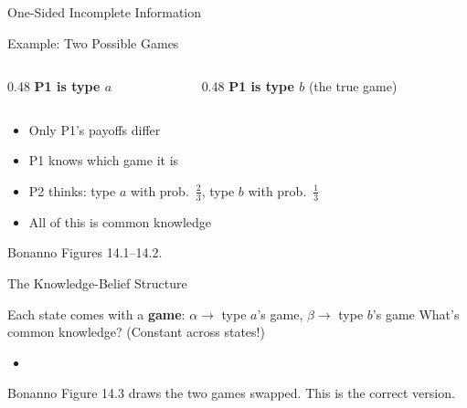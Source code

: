 
\begin{frame}[standout]
One-Sided Incomplete Information
\end{frame}

\begin{frame}{Example: Two Possible Games}
\begin{columns}[T]
\begin{column}{0.48\textwidth}
\centering
\textbf{P1 is type $a$}\\[4pt]
\gamea
\end{column}
\begin{column}{0.48\textwidth}
\centering
\textbf{P1 is type $b$} (the true game)\\[4pt]
\gameb
\end{column}
\end{columns}
\bsk
\begin{itemize}
    \item Only P1's payoffs differ
    \item P1 knows which game it is
    \item P2 thinks: type $a$ with prob.\ $\tfrac23$, type $b$ with prob.\ $\tfrac13$
    \item All of this is common knowledge
\end{itemize}
\vfill
{\footnotesize Bonanno Figures 14.1--14.2.}
\vspace{-0.2in}
\end{frame}

\begin{frame}{The Knowledge-Belief Structure}
\centering
\onesided
\bsk
\raggedright
Each state comes with a \textbf{game}: $\alpha\to$ type $a$'s game, $\beta\to$ type $b$'s game
\bsk
What's common knowledge? (Constant across states!)
\begin{itemize}
    \item \underline{\hspace{1.5in}} \quad \underline{\hspace{1.5in}} \quad \underline{\hspace{1.5in}}
\end{itemize}
\vfill
{\footnotesize Bonanno Figure 14.3 draws the two games swapped. This is the correct version.}
\vspace{-0.2in}
\end{frame}

